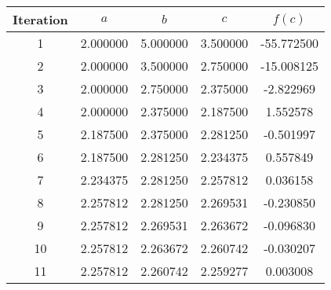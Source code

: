 \begin{tabular}{|c|c|c|c|c|}
\hline
Iteration & $a$ & $b$ & $c$ & $f(c)$ \\
\hline
1 & 2.000000 & 5.000000 & 3.500000 & -55.772500 \\
\hline
2 & 2.000000 & 3.500000 & 2.750000 & -15.008125 \\
\hline
3 & 2.000000 & 2.750000 & 2.375000 & -2.822969 \\
\hline
4 & 2.000000 & 2.375000 & 2.187500 & 1.552578 \\
\hline
5 & 2.187500 & 2.375000 & 2.281250 & -0.501997 \\
\hline
6 & 2.187500 & 2.281250 & 2.234375 & 0.557849 \\
\hline
7 & 2.234375 & 2.281250 & 2.257812 & 0.036158 \\
\hline
8 & 2.257812 & 2.281250 & 2.269531 & -0.230850 \\
\hline
9 & 2.257812 & 2.269531 & 2.263672 & -0.096830 \\
\hline
10 & 2.257812 & 2.263672 & 2.260742 & -0.030207 \\
\hline
11 & 2.257812 & 2.260742 & 2.259277 & 0.003008 \\
\hline
\end{tabular}